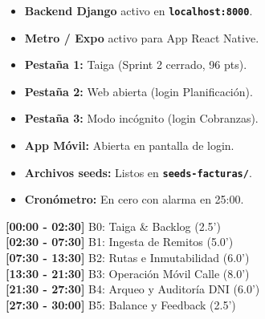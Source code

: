 \documentclass[a4paper,9pt]{article}
\newcommand{\codeb}[1]{\texttt{\bfseries #1}}
\begin{document}
\hfill
\begin{minipage}[t]{0.36\textwidth}
\begin{tcolorbox}[cardheader, title={\small Checklist Pre-Vuelo (15 min antes)}, top=2pt, bottom=2pt]
{\scriptsize
\begin{itemize}[leftmargin=9pt]
\item[$\square$] \textbf{Backend Django} activo en \codeb{localhost:8000}.
\item[$\square$] \textbf{Metro / Expo} activo para App React Native.
\item[$\square$] \textbf{Pestaña 1:} Taiga (Sprint 2 cerrado, 96 pts).
\item[$\square$] \textbf{Pestaña 2:} Web abierta (login Planificación).
\item[$\square$] \textbf{Pestaña 3:} Modo incógnito (login Cobranzas).
\item[$\square$] \textbf{App Móvil:} Abierta en pantalla de login.
\item[$\square$] \textbf{Archivos seeds:} Listos en \codeb{seeds-facturas/}.
\item[$\square$] \textbf{Cronómetro:} En cero con alarma en 25:00.
\end{itemize}
}
\end{tcolorbox}

\vspace{-5pt}

\begin{tcolorbox}[cardheader, title={\small Timeboxing Maestro (30 min)}, top=2pt, bottom=2pt]
{\scriptsize
\textbf{[00:00 - 02:30]} B0: Taiga \& Backlog (2.5') \\
\textbf{[02:30 - 07:30]} B1: Ingesta de Remitos (5.0') \\
\textbf{[07:30 - 13:30]} B2: Rutas e Inmutabilidad (6.0') \\
\textbf{[13:30 - 21:30]} B3: Operación Móvil Calle (8.0') \\
\textbf{[21:30 - 27:30]} B4: Arqueo y Auditoría DNI (6.0') \\
\textbf{[27:30 - 30:00]} B5: Balance y Feedback (2.5')
}
\end{tcolorbox}
\end{minipage}

\vspace{-4pt}
\end{document}
